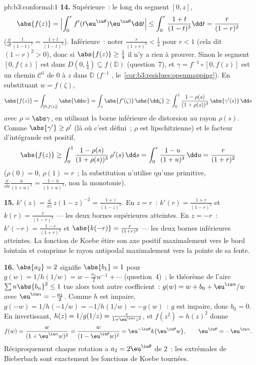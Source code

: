 \begin{solution}{pb:b3:conformal:1}
\textbf{14.} Supérieure~: le long du segment $[0, z]$,
\[
\abs{f(z)} = \Bigl|\int_0^rf'(t\eu^{\iu\theta})
\eu^{\iu\theta}\dd t\Bigr|
\leq \int_0^r\frac{1+t}{(1-t)^3}\dd t
= \frac{r}{(1-r)^2}
\]
($\frac{\dd}{\dd t}\frac t{(1-t)^2} = \frac{1+t}{(1-t)^3}$).
Inférieure~: noter $\frac r{(1+r)^2} < \frac14$ pour $r < 1$
(cela dit $(1-r)^2 > 0$), donc si $\abs{f(z)} \geq \frac14$
il n'y a rien à prouver. Sinon le segment $[0, f(z)]$ est
dans $D(0, \frac14) \subseteq f(\mathbb D)$ (question~7), et
$\gamma = f^{-1}\circ[0, f(z)]$ est un chemin $\mathcal C^1$
de $0$ à $z$ dans $\mathbb D$ ($f^{-1}$ ,
le~\cref{cor:b3:residues:openmapping}). En substituant $w =
f(\zeta)$,
\[
\abs{f(z)} = \int_{[0,f(z)]}\abs{\dd w}
= \int_\gamma\abs{f'(\zeta)}\,\abs{\dd\zeta}
\geq \int_0^1\frac{1 - \rho(s)}{(1 + \rho(s))^3}
\,\abs{\gamma'(s)}\,\dd s
\]
avec $\rho = \abs\gamma$, en utilisant la borne inférieure
de distorsion au rayon $\rho(s)$. Comme $\abs{\gamma'} \geq
\rho'$ (là où c'est défini~; $\rho$ est lipschitzienne) et
le facteur d'intégrande est positif,
\[
\abs{f(z)} \geq \int_0^1
\frac{1 - \rho(s)}{(1 + \rho(s))^3}\,\rho'(s)\,\dd s
= \int_0^{r}\frac{1 - u}{(1 + u)^3}\,\dd u
= \frac{r}{(1 + r)^2}
\]
($\rho(0) = 0$, $\rho(1) = r$~; la substitution n'utilise
qu'une primitive, $\frac{\dd}{\dd u}\frac u{(1+u)^2} =
\frac{1-u}{(1+u)^3}$, non la monotonie).

\textbf{15.} $k'(z) = \frac{\dd}{\dd z}\,z(1 - z)^{-2} =
\frac{1 + z}{(1 - z)^3}$. En $z = r$~: $k'(r) =
\frac{1+r}{(1-r)^3}$ et $k(r) = \frac r{(1-r)^2}$ --- les
deux bornes supérieures atteintes. En $z = -r$~: $k'(-r) =
\frac{1-r}{(1+r)^3}$ et $\abs{k(-r)} = \frac r{(1+r)^2}$
--- les deux bornes inférieures atteintes. La fonction de
Koebe étire son axe positif maximalement vers le bord
lointain et comprime le rayon antipodal maximalement vers
la pointe de sa fente.

\textbf{16.} $\abs{a_2} = 2$ signifie $\abs{b_1} = 1$ pour
$g(w) = 1/h(1/w) = w - \frac{a_2}2w^{-1} + \cdots$
(question~4)~; le théorème de l'aire $\sum n\abs{b_n}^2
\leq 1$ tue alors tout autre coefficient~: $g(w) = w + b_0
+ \eu^{\iu\alpha}/w$ avec $\eu^{\iu\alpha} = -\frac{a_2}2$.
Comme $h$ est impaire, $g(-w) = 1/h(-1/w) = -1/h(1/w) =
-g(w)$~: $g$ est impaire, donc $b_0 = 0$. En invertissant,
$h(z) = 1/g(1/z) = \frac{z}{1 + \eu^{\iu\alpha}z^2}$, et
$f(z^2) = h(z)^2$ donne
\[
f(w) = \frac{w}{(1 + \eu^{\iu\alpha}w)^2}
= \frac{w}{(1 - \eu^{\iu\theta}w)^2}
= \eu^{-\iu\theta}k\bigl(\eu^{\iu\theta}w\bigr),
\qquad \eu^{\iu\theta} = -\eu^{\iu\alpha} .
\]
Réciproquement chaque rotation a $a_2 = 2\eu^{\iu\theta}$ de
 $2$~: les extrémales de Bieberbach sont exactement
les fonctions de Koebe tournées.


\end{solution}
